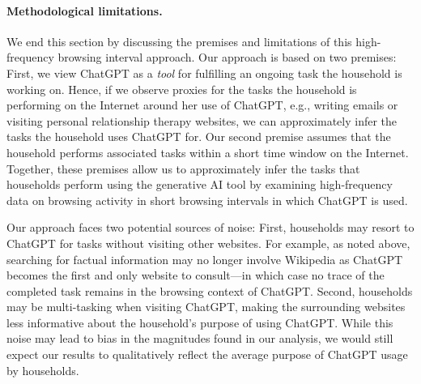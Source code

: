 \documentclass[12pt]{article}
\begin{document}
\paragraph{Methodological limitations.} We end this section by discussing the premises and limitations of this high-frequency browsing interval approach. Our approach is based on two premises: First, we view ChatGPT as a \textit{tool} for fulfilling an ongoing task the household is working on. Hence, if we observe proxies for the tasks the household is performing on the Internet around her use of ChatGPT, e.g., writing emails or visiting personal relationship therapy websites, we can approximately infer the tasks the household uses ChatGPT for. Our second premise assumes that the household performs associated tasks within a short time window on the Internet. Together, these premises allow us to approximately infer the tasks that households perform using the generative AI tool by examining high-frequency data on browsing activity in short browsing intervals in which ChatGPT is used. 

Our approach faces two potential sources of noise: First, households may resort to ChatGPT for tasks without visiting other websites. For example, as noted above, searching for factual information may no longer involve Wikipedia as ChatGPT becomes the first and only website to consult---in which case no trace of the completed task remains in the browsing context of ChatGPT. Second, households may be multi-tasking when visiting ChatGPT, making the surrounding websites less informative about the household's purpose of using ChatGPT. While this noise may lead to bias in the magnitudes found in our analysis, we would still expect our results to qualitatively reflect the average purpose of ChatGPT usage by households.




\end{document}
